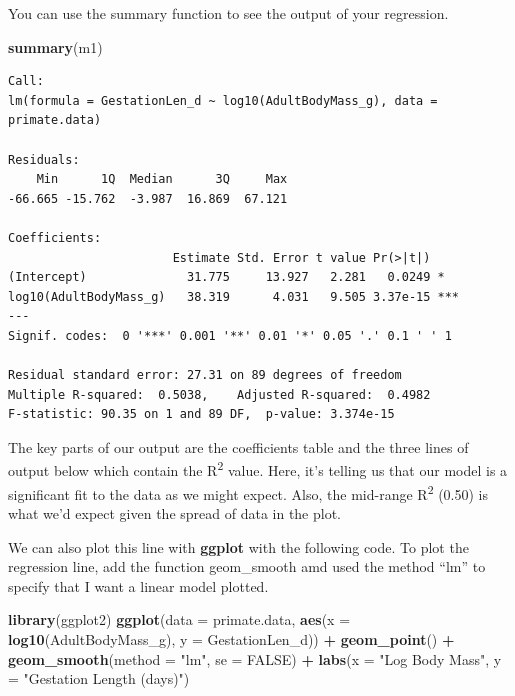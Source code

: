 \documentclass[
]{book}
\newenvironment{Shaded}{\begin{snugshade}}{\end{snugshade}}
\newcommand{\DataTypeTok}[1]{\textcolor[rgb]{0.13,0.29,0.53}{#1}}
\newcommand{\KeywordTok}[1]{\textcolor[rgb]{0.13,0.29,0.53}{\textbf{#1}}}
\newcommand{\NormalTok}[1]{#1}
\newcommand{\OperatorTok}[1]{\textcolor[rgb]{0.81,0.36,0.00}{\textbf{#1}}}
\newcommand{\OtherTok}[1]{\textcolor[rgb]{0.56,0.35,0.01}{#1}}
\newcommand{\StringTok}[1]{\textcolor[rgb]{0.31,0.60,0.02}{#1}}
\begin{document}
You can use the summary function to see the output of your regression.

\begin{Shaded}
\begin{Highlighting}[]
\KeywordTok{summary}\NormalTok{(m1)}
\end{Highlighting}
\end{Shaded}

\begin{verbatim}
Call:
lm(formula = GestationLen_d ~ log10(AdultBodyMass_g), data = primate.data)

Residuals:
    Min      1Q  Median      3Q     Max 
-66.665 -15.762  -3.987  16.869  67.121 

Coefficients:
                       Estimate Std. Error t value Pr(>|t|)    
(Intercept)              31.775     13.927   2.281   0.0249 *  
log10(AdultBodyMass_g)   38.319      4.031   9.505 3.37e-15 ***
---
Signif. codes:  0 '***' 0.001 '**' 0.01 '*' 0.05 '.' 0.1 ' ' 1

Residual standard error: 27.31 on 89 degrees of freedom
Multiple R-squared:  0.5038,    Adjusted R-squared:  0.4982 
F-statistic: 90.35 on 1 and 89 DF,  p-value: 3.374e-15
\end{verbatim}

The key parts of our output are the coefficients table and the three lines of output below which contain the R\textsuperscript{2} value. Here, it's telling us that our model is a significant fit to the data as we might expect. Also, the mid-range R\textsuperscript{2} (0.50) is what we'd expect given the spread of data in the plot.

We can also plot this line with \textbf{ggplot} \citep{ggplot2} with the following code. To plot the regression line, add the function geom\_smooth amd used the method ``lm'' to specify that I want a linear model plotted.

\begin{Shaded}
\begin{Highlighting}[]
\KeywordTok{library}\NormalTok{(ggplot2)}
\KeywordTok{ggplot}\NormalTok{(}\DataTypeTok{data =}\NormalTok{ primate.data, }\KeywordTok{aes}\NormalTok{(}\DataTypeTok{x =} \KeywordTok{log10}\NormalTok{(AdultBodyMass\_g), }\DataTypeTok{y =}\NormalTok{ GestationLen\_d)) }\OperatorTok{+}
\StringTok{  }\KeywordTok{geom\_point}\NormalTok{() }\OperatorTok{+}\StringTok{ }
\StringTok{  }\KeywordTok{geom\_smooth}\NormalTok{(}\DataTypeTok{method =} \StringTok{"lm"}\NormalTok{, }\DataTypeTok{se =} \OtherTok{FALSE}\NormalTok{) }\OperatorTok{+}
\StringTok{  }\KeywordTok{labs}\NormalTok{(}\DataTypeTok{x =} \StringTok{"Log Body Mass"}\NormalTok{, }\DataTypeTok{y =} \StringTok{"Gestation Length (days)"}\NormalTok{)}
\end{Highlighting}
\end{Shaded}
\end{document}
